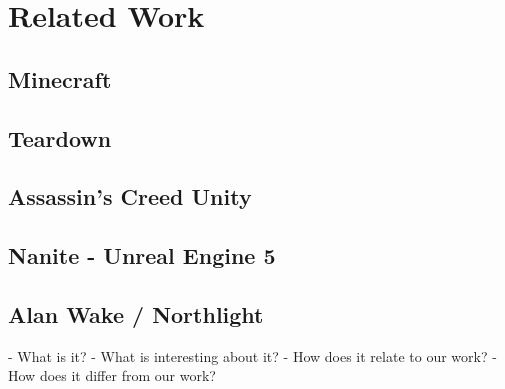 \chapter{Related Work} \label{cpt-related-work}

\section{Minecraft}

\section{Teardown}

\section{Assassin's Creed Unity}

\section{Nanite - Unreal Engine 5}

\section{Alan Wake / Northlight}





- What is it?
- What is interesting about it?
- How does it relate to our work?
- How does it differ from our work?
